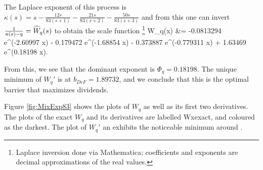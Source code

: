\fi

The Laplace exponent of this process is
$\kappa(s) = s - \frac{12 s}{83 (s+1)}-\frac{21 s}{83 (s+2)}-\frac{50 s}{83 (s+3)}$ and from this one can invert $\frac{1}{\kappa(s) - q} =  \widehat{W}_q(s)$ to obtain the scale function \footnote{Laplace inversion done via Mathematica; coefficients and exponents are decimal approximations of the real values.}
\bea
W_q(x)  &= -0.0813294 e^{(-2.60997 x)} - 0.179472 e^{(-1.68854 x)} - 0.373887 e^{(-0.779311 x)}  + 1.63469 e^{(0.18198 x)}.
\eea

From this, we see that the dominant exponent is $\Phi_q = 0.18198$. The unique minimum of $W_q'$ is at $b_{DeF}=1.89732$, and we conclude that this is the optimal barrier that  maximizes dividends.

Figure \ref{fig:MixExp83} shows the plots of $W_q$ as well as its first two derivatives. The plots of the exact $W_q$ and its derivatives are labelled Wxexact, and coloured as the darkest. The plot of $W_q'$ an exhibits the noticeable minimum around .%

